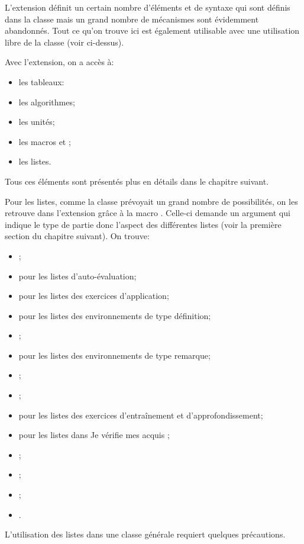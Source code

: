 \documentclass[nocrop]{sesamanuel}
\begin{document}
L'extension définit un certain nombre d'éléments et de syntaxe qui
sont définis dans la classe mais un grand nombre de mécanismes sont
évidemment abandonnés. Tout ce qu'on trouve ici est également
utilisable avec une utilisation \og libre \fg{} de la classe (voir
ci-dessus).

Avec l'extension, on a accès à:
\begingroup
{}
\begin{itemize}
\item les tableaux:
\item les algorithmes;
\item les unités;
\item les macros  et ;
\item les listes.
\end{itemize}
\endgroup

Tous ces éléments sont présentés plus en détails dans le chapitre
suivant.

Pour les listes, comme la classe prévoyait un grand nombre de
possibilités, on les retrouve dans l'extension grâce à la macro
. Celle-ci demande un argument qui indique le type de
partie donc l'aspect des différentes listes (voir la première section
du chapitre suivant). On trouve:
\begingroup
{}
\begin{itemize}
\item {};
\item {} pour les listes d'auto-évaluation;
\item {} pour les listes des exercices
  d'application;
\item {} pour les listes des environnements de type
  définition;
\item {} ;
\item {} pour les listes des environnements de type
  remarque;
\item {};
\item {};
\item {} pour les listes des exercices
  d'entraînement et d'approfondissement;
\item {} pour les listes dans \og Je vérifie mes
  acquis \fg{};
\item {};
\item {};
\item {};
\item {}.
\end{itemize}
\endgroup
L'utilisation des listes dans une classe générale requiert quelques
précautions.
\end{document}
